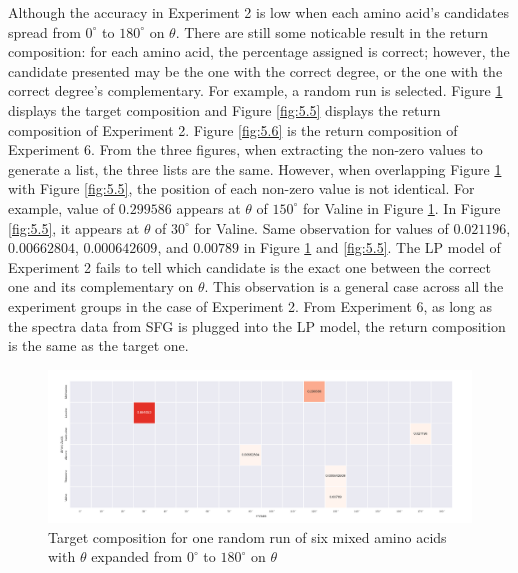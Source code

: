Although the accuracy in Experiment 2 is low when each amino acid's candidates spread from $0^{\circ}$ to $180^{\circ}$ on $\theta$. There are still some noticable result in the return composition: for each amino acid, the percentage assigned is correct; however, the candidate presented may be the one with the correct degree, or the one with the correct degree's complementary. For example, a random run is selected. Figure \ref{fig:5.4} displays the target composition and Figure \ref{fig:5.5} displays the return composition of Experiment 2. Figure \ref{fig:5.6} is the return composition of Experiment 6. From the three figures, when extracting the non-zero values to generate a list, the three lists are the same. However, when overlapping Figure \ref{fig:5.4} with Figure  \ref{fig:5.5}, the position of each non-zero value is not identical. For example, value of $0.299586$ appears at $\theta$ of $150^{\circ}$ for Valine in Figure \ref{fig:5.4}. In Figure \ref{fig:5.5}, it appears at $\theta$ of $30^{\circ}$ for Valine. Same observation for values of $0.021196$, $0.00662804$, $0.000642609$, and $0.00789$ in Figure \ref{fig:5.4} and \ref{fig:5.5}. The LP model of Experiment 2 fails to tell which candidate is the exact one between the correct one and its complementary on $\theta$. This observation is a general case across all the experiment groups in the case of Experiment 2. From Experiment 6, as long as the spectra data from SFG is plugged into the LP model, the return composition is the same as the target one. \\

\begin{figure}[!ht] 
\centering
\includegraphics[scale=0.4]{Figures/mixture_target_composition_for_one_run_theta_0_180.png}
\caption{Target composition for one random run of six mixed amino acids with $\theta$ expanded from $0^{\circ}$ to $180^{\circ}$ on $\theta$} 
\label{fig:5.4}
\end{figure}

